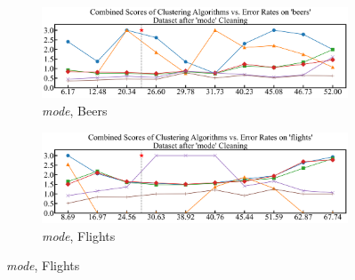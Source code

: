 \documentclass[10pt]{article} %
\numberwithin{equation}{section}
\begin{document}
\begin{figure}[H]
  \centering
  \footnotesize %
  \setlength{\abovecaptionskip}{2pt} %
  \setlength{\belowcaptionskip}{0pt} %

  \begin{subfigure}{0.48\linewidth} %
    \centering
    \includegraphics[width=\linewidth]{figures/mode_beers_combined_scores.png}
    \caption{\textit{mode}, Beers}
    \label{fig:mode_beers}
  \end{subfigure}
  \hfill
  \begin{subfigure}{0.48\linewidth}
    \centering
    \includegraphics[width=\linewidth]{figures/mode_flights_combined_scores.png}
    \caption{\textit{mode}, Flights}
    \label{fig:mode_flights}
  \end{subfigure}

  \vspace{0.2em} %


\end{figure}
\end{document}
